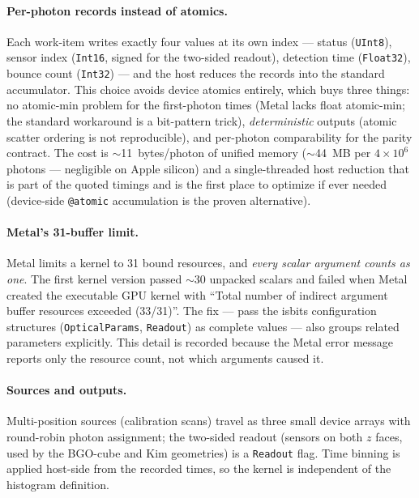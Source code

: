 \documentclass[11pt,a4paper]{article}
\newcommand{\code}[1]{\texttt{#1}}
\begin{document}
\paragraph{Per-photon records instead of atomics.} Each work-item writes exactly four
values at its own index --- status (\code{UInt8}), sensor index (\code{Int16}, signed
for the two-sided readout), detection time (\code{Float32}), bounce count
(\code{Int32}) --- and the host reduces the records into the standard accumulator.
This choice avoids device atomics entirely, which buys three things: no atomic-min
problem for the first-photon times (Metal lacks float atomic-min; the standard
workaround is a bit-pattern trick), \emph{deterministic} outputs (atomic scatter
ordering is not reproducible), and per-photon comparability for the parity contract.
The cost is $\sim$11~bytes/photon of unified memory ($\sim$44~MB per $4\times10^6$
photons --- negligible on Apple silicon) and a single-threaded host reduction that is
part of the quoted timings and is the first place to optimize if ever needed
(device-side \code{@atomic} accumulation is the proven alternative).

\paragraph{Metal's 31-buffer limit.} Metal limits a kernel to 31 bound resources,
and \emph{every scalar argument counts as one}. The first kernel version passed
$\sim$30 unpacked scalars and failed when Metal created the executable GPU kernel
with ``Total number of
indirect argument buffer resources exceeded (33/31)''. The fix --- pass the isbits
configuration structures (\code{OpticalParams}, \code{Readout}) as complete values ---
also groups related parameters explicitly. This detail is recorded because the Metal
error message reports only the resource count, not which arguments caused it.

\paragraph{Sources and outputs.} Multi-position sources (calibration scans) travel as
three small device arrays with round-robin photon assignment; the two-sided readout
(sensors on both $z$ faces, used by the BGO-cube and Kim geometries) is a
\code{Readout} flag. Time binning is applied host-side from the recorded times, so the
kernel is independent of the histogram definition.

\end{document}
